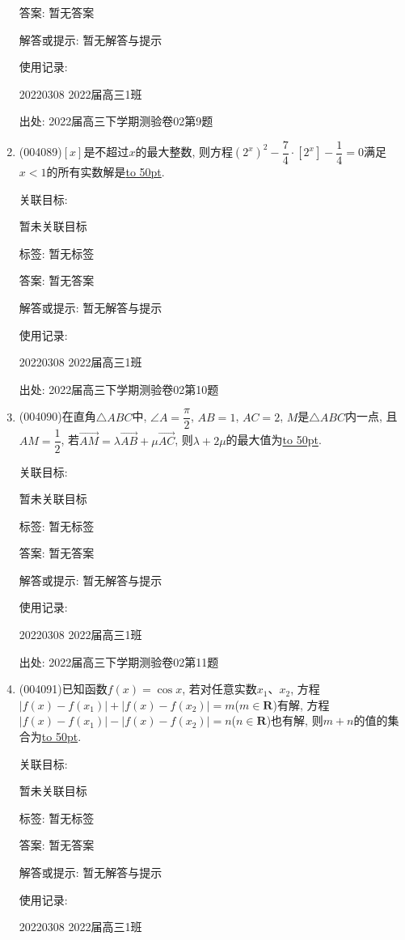 \documentclass[10pt,a4paper]{article}
\newcommand{\blank}[1]{\underline{\hbox to #1pt{}}}
\begin{document}
\begin{enumerate}[1.]
答案: 暂无答案

解答或提示: 暂无解答与提示

使用记录:

20220308	2022届高三1班	


出处: 2022届高三下学期测验卷02第9题
\item { (004089)}$[x]$是不超过$x$的最大整数, 则方程$(2^x)^2-\dfrac 74\cdot [2^x]-\dfrac 14=0$满足$x<1$的所有实数解是\blank{50}.


关联目标:

暂未关联目标



标签: 暂无标签

答案: 暂无答案

解答或提示: 暂无解答与提示

使用记录:

20220308	2022届高三1班	


出处: 2022届高三下学期测验卷02第10题
\item { (004090)}在直角$\triangle ABC$中, $\angle A=\dfrac{\pi}2$, $AB=1$, $AC=2$, $M$是$\triangle ABC$内一点, 且$AM=\dfrac 12$, 若$\overrightarrow{AM}=\lambda \overrightarrow{AB}+\mu \overrightarrow{AC}$, 则$\lambda +2\mu$的最大值为\blank{50}.


关联目标:

暂未关联目标



标签: 暂无标签

答案: 暂无答案

解答或提示: 暂无解答与提示

使用记录:

20220308	2022届高三1班	


出处: 2022届高三下学期测验卷02第11题
\item { (004091)}已知函数$f(x)=\cos x$, 若对任意实数$x_1$、$x_2$, 方程$|f(x)-f(x_1)|+|f(x)-f(x_2)|=m$($m\in \mathbf{R}$)有解, 方程$|f(x)-f(x_1)|-|f(x)-f(x_2)|=n$($n\in \mathbf{R}$)也有解, 则$m+n$的值的集合为\blank{50}.


关联目标:

暂未关联目标



标签: 暂无标签

答案: 暂无答案

解答或提示: 暂无解答与提示

使用记录:

20220308	2022届高三1班	



\end{enumerate}
\end{document}
